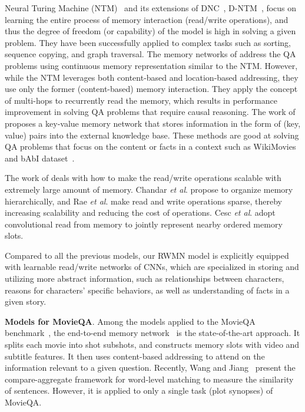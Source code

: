 \documentclass[10pt,twocolumn,letterpaper]{article}
\makeatletter
\theoremstyle{nonumberplain}
\DeclareRobustCommand\onedot{\futurelet\@let@token\@onedot}
\def\onedot{.\@\xspace}
\def\etal{\emph{et al}\onedot}
\makeatother
\begin{document}
Neural Turing Machine (NTM)~\cite{graves2014neural} and its extensions of DNC~\cite{graves2016hybrid}, D-NTM~\cite{gulcehre2016dynamic}, focus on learning the entire process of memory interaction (read/write operations), and thus the degree of freedom (or capability) of the model is high in solving a given problem.  
They have been successfully applied to complex tasks such as sorting, sequence copying, and graph traversal.
The memory networks of \cite{kumar2015ask,sukhbaatar2015end,weston2014memory} address the QA problems using continuous memory representation similar to the NTM. 
However, while the NTM leverages both content-based and location-based addressing, they use only the former (content-based) memory interaction. They apply the concept of multi-hops to recurrently read the memory, which results in performance improvement in solving QA problems that require causal reasoning. 
The work of \cite{miller2016key,zhang2016dynamic} proposes a key-value memory network that stores information in the form of (key, value) pairs into the external knowledge base. These methods are good at solving QA problems that  focus on the content or facts in a context such as WikiMovies~\cite{miller2016key} and bAbI dataset~\cite{weston2015towards}.


The work of \cite{chandar2016hierarchical,rae2016scaling} deals with how to make the read/write operations scalable with extremely large amount of memory. Chandar \etal\cite{chandar2016hierarchical} propose to organize memory hierarchically, and Rae \etal\cite{rae2016scaling} make read and write operations sparse, thereby increasing scalability and reducing the cost of operations.  Cesc \etal\cite{attend2u:2017:CVPR} adopt convolutional read from memory to jointly represent nearby ordered memory slots.

Compared to all the previous models, our RWMN model is explicitly equipped with learnable read/write networks of CNNs,
which are specialized in storing and utilizing more abstract information, such as relationships between characters, reasons for characters' specific behaviors, as well as understanding of facts in a given story.


\smallskip
\textbf{Models for MovieQA}.
Among the models applied to the MovieQA benchmark~\cite{tapaswi2016movieqa}, the end-to-end memory network~\cite{sukhbaatar2015end} is the state-of-the-art approach. It splits each movie into shot subshots, and constructs memory slots with video and subtitle features. 
It then uses content-based addressing to attend on the information relevant to a given question. 
Recently, Wang and Jiang~\cite{wang2017compare} present the compare-aggregate framework for word-level matching to measure the similarity of sentences. 
However, it is applied to only a single task (plot synopses) of MovieQA. 
\end{document}
